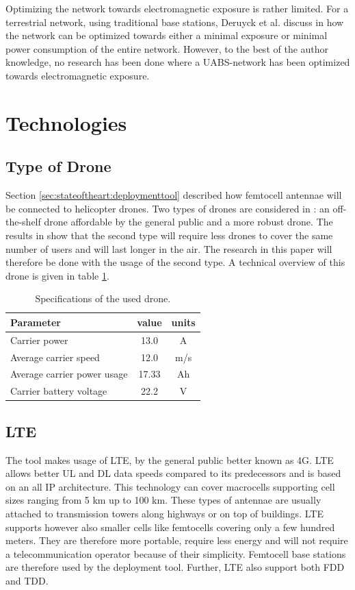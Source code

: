 Optimizing the network towards electromagnetic exposure is rather limited. For a terrestrial network, using traditional base stations,
Deruyck et al. discuss in \cite{J1} how the network can be optimized towards either a minimal exposure or minimal power consumption of the entire network.
However, to the best of the author knowledge, no research has been done where a \gls{UABS}-network has been optimized towards electromagnetic exposure.

\section{Technologies}
\subsection{Type of Drone}

Section \ref{sec:stateoftheart:deploymenttool} described how femtocell antennae will be connected to helicopter drones. Two types of 
drones are considered in \cite{J2}: an off-the-shelf drone affordable by the general public and a more robust drone. The results in \cite{J2}
show that the second type will require less drones to cover the same number of users and will last longer in the air. The research in this paper
will therefore be done with the usage of the second type. A technical overview of this drone is given in table \ref{table:dronespecs}.

\begin{table}[h!]
\centering
\begin{tabular}{|l|c|c|}
\hline
 Parameter          & value      & units   \\    \hline
 Carrier power      & 13.0 &A \\
 Average carrier speed           & 12.0 &m/s       \\ 
 Average carrier power usage    & 17.33& Ah      \\ 
 Carrier battery voltage        & 22.2 &V \\ \hline
\end{tabular}
\caption{Specifications of the used drone.}
\label{table:dronespecs}
\end{table}

\subsection{LTE}
The tool makes usage of \gls{LTE}, by the general public better known as 4G.  \gls{LTE} allows better \gls{UL} and \gls{DL} data speeds 
compared to its predecessors and is based on an all IP architecture. This technology can cover macrocells supporting cell sizes ranging from 5 km up to 100 km. 
These types of antennae are usually attached to transmission towers along highways or on top of buildings. LTE supports however also smaller cells like
femtocells covering only a few hundred meters. They are therefore more portable, require less energy and will not require a telecommunication operator because
of their simplicity. Femtocell base stations are therefore used by the deployment tool.
Further, \gls{LTE} also support both \gls{FDD} and \gls{TDD}.

